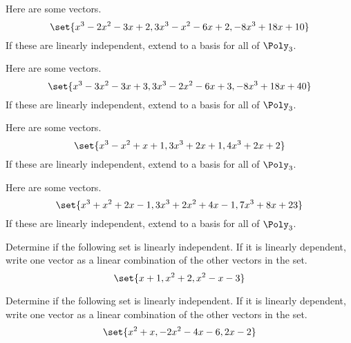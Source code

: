 \begin{enumialphparenastyle}
\begin{ex} Here are some vectors.
\begin{equation*}
\set{x^{3}-2x^{2}-3x+2,3x^{3}-x^{2}-6x+2,-8x^{3}+18x+10}
\end{equation*}
If these are linearly independent, extend to a basis for all of $\Poly_{3}$.
\end{ex}


\begin{ex} Here are some vectors.
\begin{equation*}
\set{x^{3}-3x^{2}-3x+3,3x^{3}-2x^{2}-6x+3,-8x^{3}+18x+40}
\end{equation*}
If these are linearly independent, extend to a basis for all of $\Poly_{3}$.
\end{ex}


\begin{ex} Here are some vectors.
\begin{equation*}
\set{x^{3}-x^{2}+x+1,3x^{3}+2x+1,4x^{3}+2x+2}
\end{equation*}
If these are linearly independent, extend to a basis for all of $\Poly_{3}$.
\end{ex}


\begin{ex} Here are some vectors.
\begin{equation*}
\set{x^{3}+x^{2}+2x-1,3x^{3}+2x^{2}+4x-1,7x^{3}+8x+23}
\end{equation*}
If these are linearly independent, extend to a basis for all of $\Poly_{3}$.
\end{ex}


\begin{ex} Determine if the following set is linearly independent. If it is linearly dependent, write one vector as a linear combination of the other vectors in the set. 
\[
\set{x+1, x^2 + 2, x^2 - x -3 }
\]
\end{ex}

\begin{ex} Determine if the following set is linearly independent. If it is linearly dependent, write one vector as a linear combination of the other vectors in the set. 
\[
\set{x^2 + x, -2x^2 -4x -6 , 2x - 2 }
\]
\end{ex}


\end{enumialphparenastyle}
